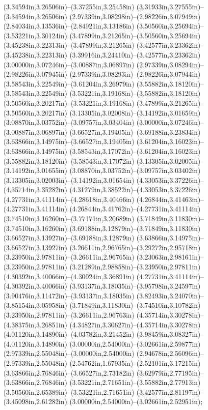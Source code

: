(3.34594in,3.26506in)--(3.37255in,3.25458in) (3.31933in,3.27555in)--(3.34594in,3.26506in) (2.97339in,3.08298in)--(2.98226in,3.07949in) (2.84034in,3.13536in)--(2.84921in,3.13186in) (3.50560in,3.25694in)--(3.53221in,3.30124in) (3.47899in,3.21265in)--(3.50560in,3.25694in) (3.45238in,3.22313in)--(3.47899in,3.21265in) (3.42577in,3.23362in)--(3.45238in,3.22313in) (3.39916in,3.24410in)--(3.42577in,3.23362in) (3.00000in,3.07246in)--(3.00887in,3.06897in) (2.97339in,3.08294in)--(2.98226in,3.07945in) (2.97339in,3.08293in)--(2.98226in,3.07944in) (3.58543in,3.22549in)--(3.61204in,3.26979in) (3.55882in,3.18120in)--(3.58543in,3.22549in) (3.53221in,3.19168in)--(3.55882in,3.18120in) (3.50560in,3.20217in)--(3.53221in,3.19168in) (3.47899in,3.21265in)--(3.50560in,3.20217in) (3.13305in,3.02008in)--(3.14192in,3.01659in) (3.08870in,3.03752in)--(3.09757in,3.03404in) (3.00000in,3.07246in)--(3.00887in,3.06897in) (3.66527in,3.19405in)--(3.69188in,3.23834in) (3.63866in,3.14975in)--(3.66527in,3.19405in) (3.61204in,3.16023in)--(3.63866in,3.14975in) (3.58543in,3.17072in)--(3.61204in,3.16023in) (3.55882in,3.18120in)--(3.58543in,3.17072in) (3.13305in,3.02005in)--(3.14192in,3.01655in) (3.08870in,3.03752in)--(3.09757in,3.03402in) (3.13305in,3.02003in)--(3.14192in,3.01654in) (4.33053in,3.37226in)--(4.35714in,3.35282in) (4.31279in,3.38522in)--(4.33053in,3.37226in) (4.27731in,3.41114in)--(4.28618in,3.40466in) (4.26844in,3.41463in)--(4.27731in,3.41114in) (4.26844in,3.41762in)--(4.27731in,3.41114in) (3.74510in,3.16260in)--(3.77171in,3.20689in) (3.71849in,3.11830in)--(3.74510in,3.16260in) (3.69188in,3.12879in)--(3.71849in,3.11830in) (3.66527in,3.13927in)--(3.69188in,3.12879in) (3.63866in,3.14975in)--(3.66527in,3.13927in) (3.26611in,2.96765in)--(3.29272in,2.95718in) (3.23950in,2.97811in)--(3.26611in,2.96765in) (3.23063in,2.98161in)--(3.23950in,2.97811in) (3.21289in,2.98858in)--(3.23950in,2.97811in) (4.30392in,3.40066in)--(4.30924in,3.36891in) (4.27731in,3.41114in)--(4.30392in,3.40066in) (3.93137in,3.18035in)--(3.95798in,3.24597in) (3.90476in,3.11472in)--(3.93137in,3.18035in) (3.82493in,3.24070in)--(3.85154in,3.05958in) (3.71849in,3.11830in)--(3.74510in,3.10782in) (3.23950in,2.97811in)--(3.26611in,2.96763in) (4.35714in,3.30278in)--(4.38375in,3.26851in) (4.34827in,3.30627in)--(4.35714in,3.30278in) (4.01120in,3.14890in)--(4.03782in,3.21452in) (3.98459in,3.08327in)--(4.01120in,3.14890in) (3.00000in,2.54000in)--(3.02661in,2.59877in) (2.97339in,2.55048in)--(3.00000in,2.54000in) (2.94678in,2.56096in)--(2.97339in,2.55048in) (2.54762in,1.67935in)--(2.52101in,3.17215in) (3.63866in,2.76846in)--(3.66527in,2.73182in) (3.62979in,2.77195in)--(3.63866in,2.76846in) (3.53221in,2.71651in)--(3.55882in,2.77913in) (3.50560in,2.65389in)--(3.53221in,2.71651in) (3.42577in,2.81197in)--(3.45098in,2.61282in) (3.00000in,2.54000in)--(3.02661in,2.52951in);
